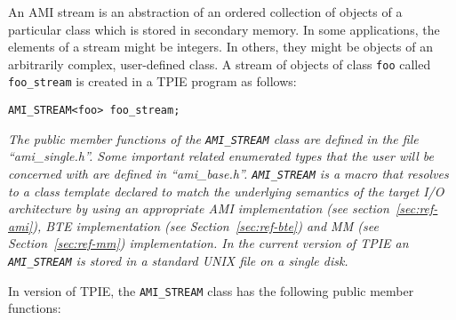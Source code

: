 \tobeextended
{}
An AMI stream is
an abstraction of an ordered collection of objects of a
particular class which is stored in secondary memory.  In some
applications, the elements of a stream might be integers.
In others, they might be objects of an arbitrarily complex, user-defined
class.  A stream of objects of class \verb|foo| called
\verb|foo_stream| is created in a TPIE program as follows:

\begin{verbatim}
AMI_STREAM<foo> foo_stream;
\end{verbatim}

{\em The public member functions of the \verb|AMI_STREAM|
   class are defined in the file ``ami\_single.h''. Some
   important related enumerated types that the user will be
   concerned with are defined in ``ami\_base.h''.
   \verb|AMI_STREAM| is a macro that resolves to a class
   template declared to match the underlying semantics of
   the target I/O architecture by using an appropriate AMI
   implementation (see section~\ref{sec:ref-ami}), BTE
   implementation (see
   Section~\ref{sec:ref-bte}) and MM (see
   Section~\ref{sec:ref-mm}) implementation. In the current
   version of TPIE an \verb|AMI_STREAM| is stored in a
   standard UNIX file on a single disk.}

In version \version of TPIE,  the \verb|AMI_STREAM| class has the
following public member functions:


